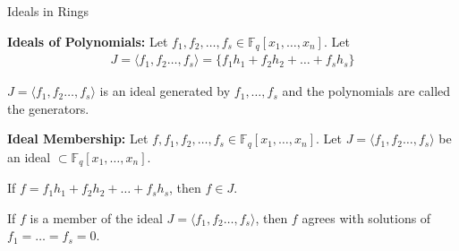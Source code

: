 \documentclass[xcolor=dvipsnames]{beamer}
\begin{document}
\begin{frame}{\large {Ideals in Rings}}
\vspace{-0.2in}



\begin{Definition}
{\bf Ideals of Polynomials:} Let $f_1, f_2, \ldots, f_s \in
\mathbb{F}_q[x_1, \dots, x_n]$. Let 
\begin{eqnarray}
J = \langle f_1, f_2 \ldots, f_s\rangle = \{f_1 h_1 + f_2 h_2 + \dots + f_s h_s\} \nonumber 
\end{eqnarray}

$J = \langle f_1, f_2 \ldots, f_s\rangle$ is an ideal generated by
$f_1, \ldots, f_s$ and the polynomials are called the generators. 
\end{Definition}


\begin{Definition}
{\bf Ideal Membership:} Let $f, f_1, f_2, \ldots, f_s \in
\mathbb{F}_q[x_1, \dots, x_n]$. Let $J = \langle f_1, f_2 \ldots,
f_s\rangle$ be an ideal $\subset \mathbb{F}_q[x_1, \dots, x_n]$. 

If $f = f_1 h_1 + f_2 h_2 + \dots + f_s h_s$, then $f \in J$. 
\end{Definition}

If $f$ is a member of the ideal $J = \langle f_1, f_2 \ldots,
f_s\rangle$, then $f$ agrees with solutions of $f_1 = \dots = f_s = 0$.
\end{frame}

\end{document}
